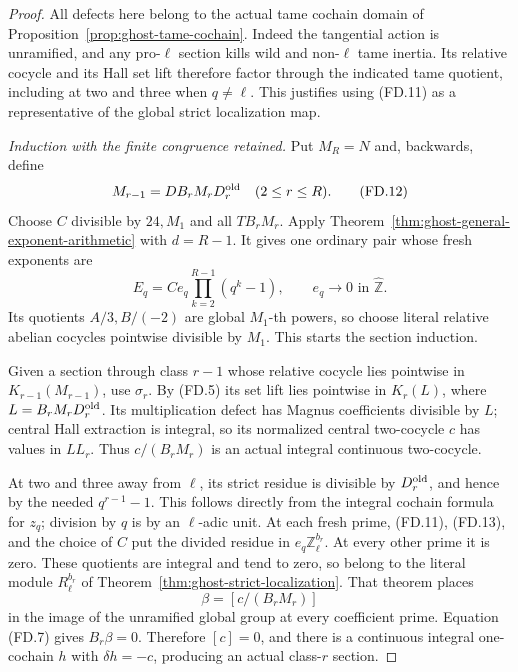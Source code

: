 \begin{proof}
All defects here belong to the actual tame
cochain domain of Proposition~\ref{prop:ghost-tame-cochain}.
Indeed the tangential action is unramified,
and any pro-\(\ell\) section kills wild and
non-\(\ell\) tame inertia. Its relative
cocycle and its Hall set lift therefore
factor through the indicated tame quotient,
including at two and three when \(q\ne\ell\).
This justifies using (FD.11) as a representative
of the global strict localization map.

\emph{Induction with the finite congruence retained.}
Put \(M_R=N\) and, backwards, define
\[
 M_{r-1}=DB_rM_rD_r^{\rm old}
                         \quad(2\le r\le R).
 \tag{FD.12}
\]
Choose \(C\) divisible by \(24,M_1\) and
all \(TB_rM_r\). Apply
Theorem~\ref{thm:ghost-general-exponent-arithmetic}
with \(d=R-1\). It gives one ordinary
pair whose fresh exponents are
\[
 E_q=C e_q\prod_{k=2}^{R-1}(q^k-1),
              \qquad e_q\longrightarrow0
                         \text{ in }\widehat{\mathbb Z}.
 \tag{FD.13}
\]
Its quotients \(A/3,B/(-2)\) are global
\(M_1\)-th powers, so choose literal relative
abelian cocycles pointwise divisible by
\(M_1\). This starts the section induction.

Given a section through class \(r-1\)
whose relative cocycle lies pointwise in
\(K_{r-1}(M_{r-1})\), use \(\sigma_r\).
By (FD.5) its set lift lies pointwise in
\(K_r(L)\), where
\(L=B_rM_rD_r^{\rm old}\). Its multiplication
defect has Magnus coefficients divisible
by \(L\); central Hall extraction is
integral, so its normalized central
two-cocycle \(c\) has values in \(LL_r\).
Thus \(c/(B_rM_r)\) is an actual integral
continuous two-cocycle.

At two and three away from \(\ell\),
its strict residue is divisible by
\(D_r^{\rm old}\), and hence by the
needed \(q^{r-1}-1\). This follows
directly from the integral cochain
formula for \(z_q\); division by \(q\)
is by an \(\ell\)-adic unit. At each
fresh prime, (FD.11), (FD.13), and the
choice of \(C\) put the divided residue
in \(e_q\mathbb Z_\ell^{b_r}\). At every
other prime it is zero. These quotients
are integral and tend to zero, so belong
to the literal module \(R_\ell^{b_r}\)
of Theorem~\ref{thm:ghost-strict-localization}.
That theorem places
\[
                 \beta=[c/(B_rM_r)]
 \tag{FD.14}
\]
in the image of the unramified global
group at every coefficient prime.
Equation (FD.7) gives \(B_r\beta=0\).
Therefore \([c]=0\), and there is a
continuous integral one-cochain \(h\)
with \(\delta h=-c\), producing an
actual class-\(r\) section.


\end{proof}
